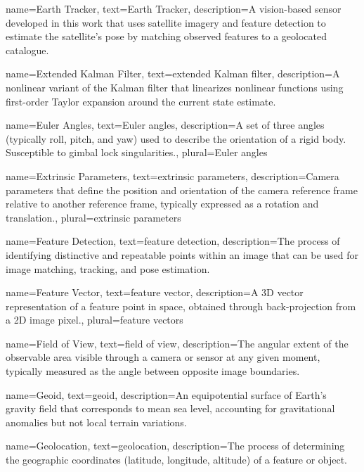 {
	name=Earth Tracker,
	text=Earth Tracker,
	description={A vision-based sensor developed in this work that uses satellite imagery and feature detection to estimate the satellite's pose by matching observed features to a geolocated catalogue.}
}

{
	name=Extended Kalman Filter,
	text=extended Kalman filter,
	description={A nonlinear variant of the Kalman filter that linearizes nonlinear functions using first-order Taylor expansion around the current state estimate.}
}

{
	name=Euler Angles,
	text=Euler angles,
	description={A set of three angles (typically roll, pitch, and yaw) used to describe the orientation of a rigid body. Susceptible to gimbal lock singularities.},
	plural=Euler angles
}

{
	name=Extrinsic Parameters,
	text=extrinsic parameters,
	description={Camera parameters that define the position and orientation of the camera reference frame relative to another reference frame, typically expressed as a rotation and translation.},
	plural=extrinsic parameters
}

{
	name=Feature Detection,
	text=feature detection,
	description={The process of identifying distinctive and repeatable points within an image that can be used for image matching, tracking, and pose estimation.}
}

{
	name=Feature Vector,
	text=feature vector,
	description={A 3D vector representation of a feature point in space, obtained through back-projection from a 2D image pixel.},
	plural=feature vectors
}

{
	name=Field of View,
	text=field of view,
	description={The angular extent of the observable area visible through a camera or sensor at any given moment, typically measured as the angle between opposite image boundaries.}
}

{
	name=Geoid,
	text=geoid,
	description={An equipotential surface of Earth's gravity field that corresponds to mean sea level, accounting for gravitational anomalies but not local terrain variations.}
}

{
	name=Geolocation,
	text=geolocation,
	description={The process of determining the geographic coordinates (latitude, longitude, altitude) of a feature or object.}
}

